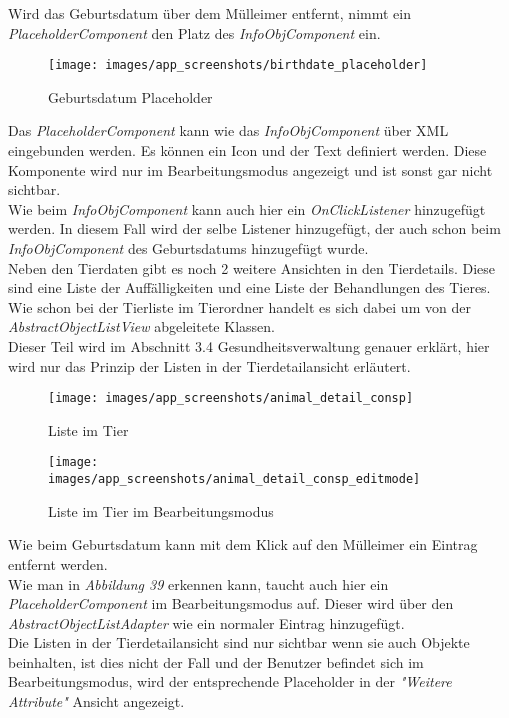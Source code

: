 Wird das Geburtsdatum über dem Mülleimer entfernt, nimmt ein \textit{PlaceholderComponent} den Platz des \textit{InfoObjComponent} ein.
\begin{figure}[H]
\centering
\texttt{[image: images/app\_screenshots/birthdate\_placeholder]}
\caption{Geburtsdatum Placeholder}
\end{figure}
Das \textit{PlaceholderComponent} kann wie das \textit{InfoObjComponent} über XML eingebunden werden. Es können ein Icon und der Text definiert werden. Diese Komponente wird nur im Bearbeitungsmodus angezeigt und ist sonst gar nicht sichtbar. \\ 
Wie beim \textit{InfoObjComponent} kann auch hier ein \textit{OnClickListener} hinzugefügt werden. In diesem Fall wird der selbe Listener hinzugefügt, der auch schon beim \textit{InfoObjComponent} des Geburtsdatums hinzugefügt wurde. \\[0.5em]
Neben den Tierdaten gibt es noch 2 weitere Ansichten in den Tierdetails. Diese sind eine Liste der Auffälligkeiten und eine Liste der Behandlungen des Tieres. Wie schon bei der Tierliste im Tierordner handelt es sich dabei um von der \textit{AbstractObjectListView} abgeleitete Klassen. \\
Dieser Teil wird im Abschnitt 3.4 Gesundheitsverwaltung genauer erklärt, hier wird nur das Prinzip der Listen in der Tierdetailansicht erläutert.
\begin{figure}[H]
  \centering
  \begin{minipage}[t]{7 cm}
  	\centering
  	\texttt{[image: images/app\_screenshots/animal\_detail\_consp]} 
    \caption{Liste im Tier}
  \end{minipage}
  \hspace{0.5cm}
  \begin{minipage}[t]{7 cm}
	\centering
	\texttt{[image: images/app\_screenshots/animal\_detail\_consp\_editmode]}  
    \caption{Liste im Tier im Bearbeitungsmodus}
  \end{minipage}
\end{figure}
Wie beim Geburtsdatum kann mit dem Klick auf den Mülleimer ein Eintrag entfernt werden. \\
Wie man in \textit{Abbildung 39} erkennen kann, taucht auch hier ein \textit{PlaceholderComponent} im Bearbeitungsmodus auf. Dieser wird über den \textit{AbstractObjectListAdapter} wie ein normaler Eintrag hinzugefügt. \\
Die Listen in der Tierdetailansicht sind nur sichtbar wenn sie auch Objekte beinhalten, ist dies nicht der Fall und der Benutzer befindet sich im Bearbeitungsmodus, wird der entsprechende Placeholder in der \textit{"Weitere Attribute"} Ansicht angezeigt.
